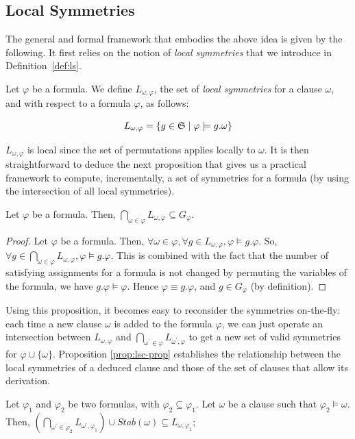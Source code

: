 \subsection{Local Symmetries}
The general and formal framework that embodies the above idea is given by the following. It first relies on the notion of \textit{local symmetries} that we introduce in Definition~\ref{def:ls}.
\begin{definition}
 \label{def:ls}
 Let $\varphi$ be a formula. We define $L_{\omega,\varphi}$, 
 the set of \textit{local symmetries} for a clause $\omega$, and with respect to 
 a formula $\varphi$, as follows:
 
 $$L_{\omega,\varphi}=\{g \in \mathfrak{S} \mid \varphi \models g.\omega\}$$
\end{definition}
$L_{\omega,\varphi}$ is local since the set of permutations applies locally to
$\omega$. It is then straightforward to deduce the next proposition that gives us a
practical framework to compute, incrementally, a set of symmetries for a
formula (by using the intersection of all local symmetries).
\begin{proposition}
 \label{prop:gls-prop}
 Let $\varphi$ be a formula. Then,  $\underset{\omega \in \varphi}{\bigcap}L_{\omega,\varphi} 
 \subseteq G_{\varphi}$.
\end{proposition}
\begin{proof}
 Let $\varphi$ be a formula. Then, $\forall \omega \in \varphi, \forall g \in L_{\omega,\varphi}, \varphi \models g.\varphi $. So, $\forall g \in \underset{\omega \in \varphi}{\bigcap}L_{\omega,\varphi}, \varphi \models g.\varphi$. This is combined with the fact that the number of satisfying assignments for a formula is not changed by permuting the variables of the formula, we have $g.\varphi \models \varphi$. Hence $\varphi \equiv g.\varphi$, and $g \in G_{\varphi}$ (by definition). 
\end{proof}
Using this proposition, it becomes easy to reconsider the symmetries
on-the-fly: each time a new clause $\omega$ is added to the formula $\varphi$,
we can just operate an intersection between $L_{\omega,\varphi}$ and
$\underset{\omega^\prime \in \varphi}{\bigcap}L_{\omega^\prime,\varphi}$ to get
a new set of valid symmetries for $\varphi \cup \{\omega\}$.
\medskip
Proposition \ref{prop:lsc-prop} establishes the relationship between the local symmetries of a deduced clause and those of the set of clauses that allow its derivation. 
\begin{proposition}
 \label{prop:lsc-prop}
 Let $\varphi_1$ and $\varphi_2$ be two formulas, with $\varphi_2 \subseteq \varphi_1$. 
 Let $\omega$ be a clause such that $\varphi_2 \models \omega$. Then, 
 $(\underset{\omega^\prime \in \varphi_2}{\bigcap}L_{\omega^\prime,\varphi_1})
 \cup Stab(\omega) \subseteq L_{\omega,\varphi_1}$;
\end{proposition} 
